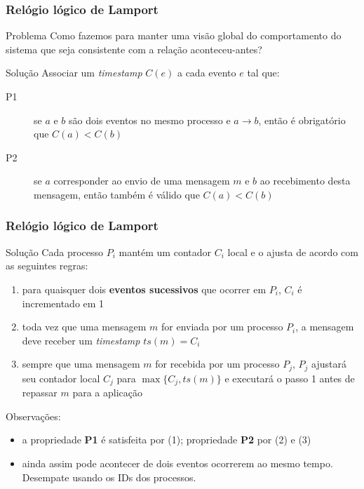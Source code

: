 \documentclass[Ligatures=TeX,table,brazil,svgnames,usetotalslideindicator,compress,10pt]{beamer}
\begin{document}
\begin{frame}
  \frametitle{Relógio lógico de Lamport}
  \begin{alertblock}{Problema}
    Como fazemos para manter uma visão global do comportamento do sistema que seja consistente com a relação aconteceu-antes?
  \end{alertblock}

  \begin{block}{Solução}
    Associar um \textit{timestamp} $C(e)$ a cada evento $e$ tal que:
    \begin{description}
    \item[P1] se $a$ e $b$ são dois eventos no mesmo processo e $a \rightarrow b$, então é obrigatório que $C(a) < C(b)$
    \item[P2] se $a$ corresponder ao envio de uma mensagem $m$ e $b$ ao recebimento desta mensagem, então também é válido que $C(a) < C(b)$
    \end{description}
  \end{block}

\end{frame}

\begin{frame}
  \frametitle{Relógio lógico de Lamport}

  \begin{block}{Solução}
    Cada processo $P_i$ mantém um contador $C_i$ \alert{local} e o ajusta de acordo com as seguintes regras:
    \begin{enumerate}
    \item para quaisquer dois \textbf{eventos sucessivos} que ocorrer em $P_i$, $C_i$ é incrementado em 1
    \item toda vez que uma mensagem $m$ for \alert{enviada} por um processo $P_i$, a mensagem deve receber um \textit{timestamp} $ts(m) = C_i$
    \item sempre que uma mensagem $m$ for \alert{recebida} por um processo $P_j$, $P_j$ ajustará seu contador local $C_j$ para \alert{$\max\{C_j, ts(m)\}$} e executará o passo 1 antes de repassar $m$ para a aplicação
    \end{enumerate}
  \end{block}

  \begin{block}{Observações:}
    \begin{itemize}
    \item a propriedade \textbf{P1} é satisfeita por (1); propriedade \textbf{P2} por (2) e (3)
    \item ainda assim pode acontecer de dois eventos ocorrerem ao mesmo tempo. \alert{Desempate usando os IDs dos processos}.
    \end{itemize}
  \end{block}

\end{frame}
\end{document}
